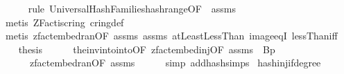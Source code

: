 \begin{isabellebody}
\ \ \ \ \isamarkupfalse%
\ {\isacharparenleft}{\kern0pt}rule\ Universal{\isacharunderscore}{\kern0pt}Hash{\isacharunderscore}{\kern0pt}Families{\isachardot}{\kern0pt}hash{\isacharunderscore}{\kern0pt}range{\isacharbrackleft}{\kern0pt}OF\ {\isacharunderscore}{\kern0pt}\ assms{\isacharparenleft}{\kern0pt}{}{\isacharparenright}{\kern0pt}{\isacharbrackright}{\kern0pt}{\isacharparenright}{\kern0pt}\isanewline
\ \ \ \ \ \isamarkupfalse%
\ {\isacharparenleft}{\kern0pt}metis\ ZFact{\isacharunderscore}{\kern0pt}is{\isacharunderscore}{\kern0pt}cring\ cring{\isacharunderscore}{\kern0pt}def{\isacharparenright}{\kern0pt}\isanewline
\ \ \ \ \isamarkupfalse%
\ {\isacharparenleft}{\kern0pt}metis\ zfact{\isacharunderscore}{\kern0pt}embed{\isacharunderscore}{\kern0pt}ran{\isacharbrackleft}{\kern0pt}OF\ assms{\isacharparenleft}{\kern0pt}{}{\isacharparenright}{\kern0pt}{\isacharbrackright}{\kern0pt}\ assms{\isacharparenleft}{\kern0pt}{}{\isacharparenright}{\kern0pt}\ atLeast{}LessThan\ image{\isacharunderscore}{\kern0pt}eqI\ lessThan{\isacharunderscore}{\kern0pt}iff{\isacharparenright}{\kern0pt}\isanewline
\ \ \isamarkupfalse%
\ {\isacharquery}{\kern0pt}thesis\isanewline
\ \ \ \ \isamarkupfalse%
\ the{\isacharunderscore}{\kern0pt}inv{\isacharunderscore}{\kern0pt}into{\isacharunderscore}{\kern0pt}into{\isacharbrackleft}{\kern0pt}OF\ zfact{\isacharunderscore}{\kern0pt}embed{\isacharunderscore}{\kern0pt}inj{\isacharbrackleft}{\kern0pt}OF\ assms{\isacharparenleft}{\kern0pt}{}{\isacharparenright}{\kern0pt}{\isacharbrackright}{\kern0pt}{\isacharcomma}{\kern0pt}\ \ B{\isacharequal}{\kern0pt}{\isachardoublequoteopen}{\isacharbraceleft}{\kern0pt}{}{\isachardot}{\kern0pt}{\isachardot}{\kern0pt}{\isacharless}{\kern0pt}p{\isacharbraceright}{\kern0pt}{\isachardoublequoteclose}{\isacharbrackright}{\kern0pt}\isanewline
\ \ \ \ \ \ zfact{\isacharunderscore}{\kern0pt}embed{\isacharunderscore}{\kern0pt}ran{\isacharbrackleft}{\kern0pt}OF\ assms{\isacharparenleft}{\kern0pt}{}{\isacharparenright}{\kern0pt}{\isacharbrackright}{\kern0pt}\isanewline
\ \ \ \ \isamarkupfalse%
\ {\isacharparenleft}{\kern0pt}simp\ add{\isacharcolon}{\kern0pt}hash{\isachardot}{\kern0pt}simps{\isacharparenright}{\kern0pt}\isanewline
{}\isamarkupfalse%
%
\endisatagproof
{\isafoldproof}%
%
\isadelimproof
\isanewline
%
\endisadelimproof
\isanewline
{}\isamarkupfalse%
\ hash{\isacharunderscore}{\kern0pt}inj{\isacharunderscore}{\kern0pt}if{\isacharunderscore}{\kern0pt}degree{\isacharunderscore}{\kern0pt}{}{\isacharcolon}{\kern0pt}\isanewline

\end{isabellebody}
